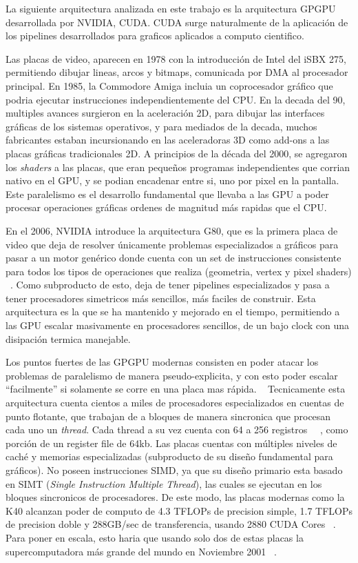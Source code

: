 La siguiente arquitectura analizada en este trabajo es la arquitectura GPGPU desarrollada por NVIDIA, CUDA.
CUDA surge naturalmente de la aplicaci\'on de los pipelines desarrollados para
graficos aplicados a computo cientifico.

Las placas de video, aparecen en 1978 con la introducci\'on de Intel del iSBX 275, permitiendo dibujar lineas,
arcos y bitmaps, comunicada por DMA al procesador principal. En 1985, la Commodore Amiga incluia un coprocesador
gr\'afico que podria ejecutar instrucciones independientemente del CPU. En la decada del 90, multiples
avances surgieron en la aceleraci\'on 2D, para dibujar las interfaces gr\'aficas de los sistemas operativos,
y para mediados de la decada, muchos fabricantes estaban incursionando en las aceleradoras 3D como
add-ons a las placas gr\'aficas tradicionales 2D. A principios de la d\'ecada del 2000, se agregaron los
\textit{shaders} a las placas, que eran peque\~nos programas independientes que corrian nativo en el GPU,
y se podian encadenar entre si, uno por pixel en la pantalla.~\cite{CG} Este paralelismo es el desarrollo fundamental
que llevaba a las GPU a poder procesar operaciones gr\'aficas ordenes de magnitud m\'as rapidas que el CPU.

En el 2006, NVIDIA introduce la arquitectura G80,
que es la primera placa de video que deja de resolver \'unicamente problemas especializados a gr\'aficos
para pasar a un motor gen\'erico donde cuenta con un set de instrucciones consistente para todos los
tipos de operaciones que realiza (geometria, vertex y pixel shaders) ~\cite{cudaHandbook}. Como subproducto de esto,
deja de tener pipelines especializados y pasa a tener procesadores simetricos m\'as sencillos, m\'as
faciles de construir. Esta arquitectura es la que se ha mantenido y mejorado en el tiempo, permitiendo
a las GPU escalar masivamente en procesadores sencillos, de un bajo clock con una disipaci\'on termica
manejable.

Los puntos fuertes de las GPGPU modernas consisten en poder atacar los problemas de paralelismo
de manera pseudo-explicita, y con esto poder escalar ``facilmente'' si solamente se corre en una
placa mas r\'apida. ~\cite{} Tecnicamente esta arquitectura cuenta cientos a miles de procesadores
especializados en cuentas de punto flotante, que trabajan de a bloques de manera sincronica
 que procesan cada uno un \textit{thread}. Cada thread a su vez cuenta con
64 a 256 registros ~\cite{NvidiaFermi}~\cite{NvidiaKepler}, como porci\'on de un register file de 64kb.
Las placas cuentas con m\'ultiples niveles de cach\'e y memorias especializadas (subproducto de
su dise\~no fundamental para gr\'aficos). No poseen instrucciones SIMD, ya que su dise\~no primario
esta basado en SIMT (\textit{Single Instruction Multiple Thread}), las cuales se ejecutan en los
bloques sincronicos de procesadores. De este modo, las placas modernas como la K40 alcanzan
poder de computo de 4.3 TFLOPs de precision simple, 1.7 TFLOPs de precision doble y 288GB/sec de
transferencia, usando 2880 CUDA Cores ~\cite{NvidiaKeplerDatasheet}. Para poner en escala, esto haria
que usando solo dos de estas placas la supercomputadora m\'as grande del mundo en Noviembre
2001 ~\cite{Top500November2001}.

